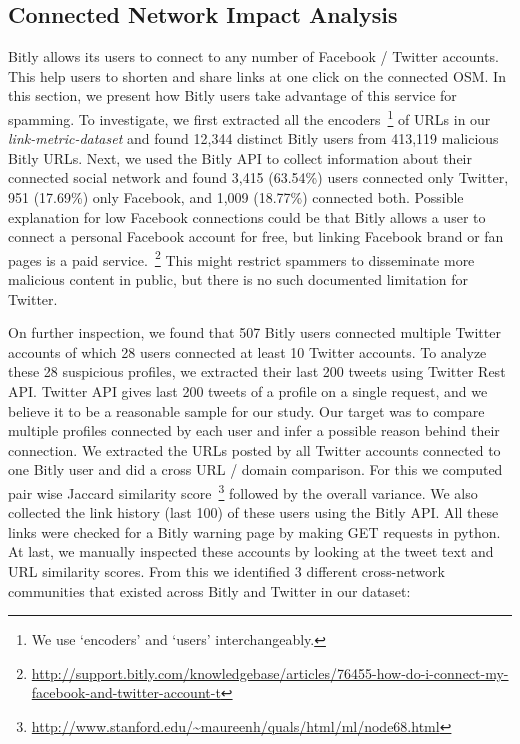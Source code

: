 \documentclass[conference]{IEEEtran}
\begin{document}
\subsection{Connected Network Impact Analysis}\label{Connected Network Impact Analysis}
\vspace{4pt}
Bitly allows its users to connect to any number of Facebook / Twitter accounts. This help users to shorten and share links at one click on the connected OSM. In this section, we present how Bitly users take advantage of this service for spamming. To investigate, we first extracted all the encoders~\footnote{We use `encoders' and `users' interchangeably.} of URLs in our \textit{link-metric-dataset} and found 12,344 distinct Bitly users from 413,119 malicious Bitly URLs. Next, we used the Bitly API to collect information about their connected social network and
found 3,415 (63.54\%) users connected only Twitter, 951 (17.69\%) only Facebook, and 1,009 (18.77\%) connected both.
Possible explanation for low Facebook connections could be that Bitly allows a user to connect a personal Facebook account for free, but linking Facebook brand or fan pages is a paid service.~\footnote{\url{http://support.bitly.com/knowledgebase/articles/76455-how-do-i-connect-my-facebook-and-twitter-account-t}} 
This might restrict spammers to disseminate more malicious content in public, but there is no such documented limitation for Twitter. 

On further inspection, we found that 507 Bitly users connected multiple Twitter accounts of which 28 users connected at least 10 Twitter accounts. To analyze these 28 suspicious profiles, we extracted their last 200 tweets using Twitter Rest API. Twitter API gives last 200 tweets of a profile on a single request, and we believe it to be a reasonable sample for our study. Our target was to compare multiple profiles connected by each user and infer a possible reason behind their connection. We extracted the URLs posted by all Twitter accounts connected to one Bitly user and did a cross URL / domain comparison. For this we computed pair wise Jaccard similarity score~\footnote{\url{http://www.stanford.edu/~maureenh/quals/html/ml/node68.html}} followed by the overall variance. We also collected the link history (last 100) of these users using the Bitly API. All these links were checked for a Bitly warning page by making GET requests in python. At last, we manually inspected these accounts by looking at the tweet text and URL similarity scores. From this we identified 3 different cross-network communities that existed across Bitly and Twitter in our dataset:
\end{document}
